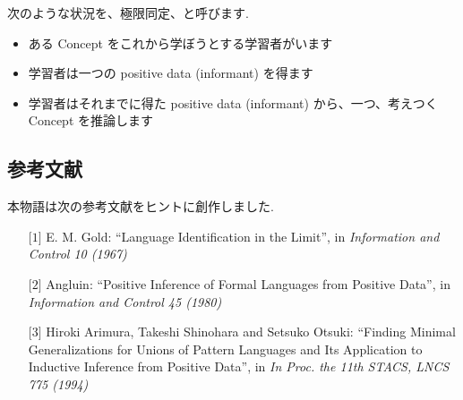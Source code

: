 \begin{boxnote}
    次のような状況を、極限同定、と呼びます.
    \begin{itemize}
        \item
            ある Concept をこれから学ぼうとする学習者がいます
        \item
            学習者は一つの positive data (informant) を得ます
        \item
            学習者はそれまでに得た positive data (informant) から、一つ、考えつく Concept を推論します
    \end{itemize}
\end{boxnote}


\subsection*{参考文献}

本物語は次の参考文献をヒントに創作しました.

\begin{enumerate}
    \item[$\lbrack 1 \rbrack$] E. M. Gold: ``Language Identification in the Limit'', in \emph{Information and Control 10 (1967)}
    \item[$\lbrack 2 \rbrack$] Angluin: ``Positive Inference of Formal Languages from Positive Data'', in \emph{Information and Control 45 (1980)}
    \item[$\lbrack 3 \rbrack$] {Hiroki Arimura, Takeshi Shinohara and Setsuko Otsuki}: ``{Finding Minimal Generalizations for Unions of Pattern Languages and Its Application to Inductive Inference from Positive Data}'', in \emph{In Proc. the 11th STACS, LNCS 775 (1994)}
\end{enumerate}
